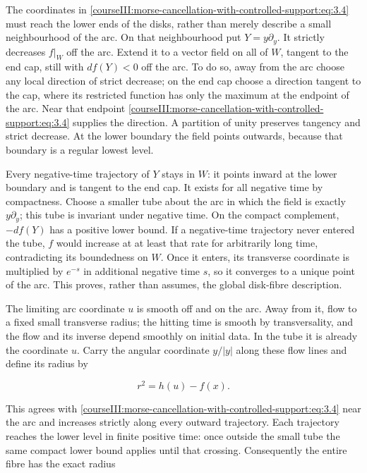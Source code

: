 The coordinates in \eqref{courseIII:morse-cancellation-with-controlled-support:eq:3.4} must reach the lower ends of the disks, rather than merely describe a small neighbourhood of the arc. On that neighbourhood put \(Y=y\partial_y\). It strictly decreases \(f|_W\) off the arc. Extend it to a vector field on all of \(W\), tangent to the end cap, still with \(df(Y)<0\) off the arc. To do so, away from the arc choose any local direction of strict decrease; on the end cap choose a direction tangent to the cap, where its restricted function has only the maximum at the endpoint of the arc. Near that endpoint \eqref{courseIII:morse-cancellation-with-controlled-support:eq:3.4} supplies the direction. A partition of unity preserves tangency and strict decrease. At the lower boundary the field points outwards, because that boundary is a regular lowest level.

Every negative-time trajectory of \(Y\) stays in \(W\): it points inward at the lower boundary and is tangent to the end cap. It exists for all negative time by compactness. Choose a smaller tube about the arc in which the field is exactly \(y\partial_y\); this tube is invariant under negative time. On the compact complement, \(-df(Y)\) has a positive lower bound. If a negative-time trajectory never entered the tube, \(f\) would increase at at least that rate for arbitrarily long time, contradicting its boundedness on \(W\). Once it enters, its transverse coordinate is multiplied by \(e^{-s}\) in additional negative time \(s\), so it converges to a unique point of the arc. This proves, rather than assumes, the global disk-fibre description.

The limiting arc coordinate \(u\) is smooth off and on the arc. Away from it, flow to a fixed small transverse radius; the hitting time is smooth by transversality, and the flow and its inverse depend smoothly on initial data. In the tube it is already the coordinate \(u\). Carry the angular coordinate \(y/|y|\) along these flow lines and define its radius by

\begin{equation}
r^2=h(u)-f(x).
\label{courseIII:morse-cancellation-with-controlled-support:eq:3.5}
\end{equation}

This agrees with \eqref{courseIII:morse-cancellation-with-controlled-support:eq:3.4} near the arc and increases strictly along every outward trajectory. Each trajectory reaches the lower level in finite positive time: once outside the small tube the same compact lower bound applies until that crossing. Consequently the entire fibre has the exact radius

